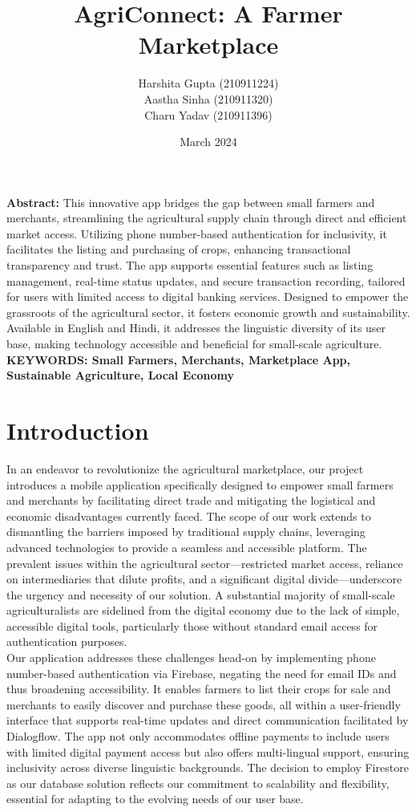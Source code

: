 \documentclass{article}
\title{\textbf{AgriConnect: A Farmer Marketplace}}
\author{Harshita Gupta (210911224)\\
        Aastha Sinha (210911320)\\
        Charu Yadav (210911396)}
\date{March 2024}
\begin{document}
\maketitle
\textbf{Abstract:}
This innovative app bridges the gap between small farmers and merchants, streamlining the agricultural supply chain through direct and efficient market access. Utilizing phone number-based authentication for inclusivity, it facilitates the listing and purchasing of crops, enhancing transactional transparency and trust. The app supports essential features such as listing management, real-time status updates, and secure transaction recording, tailored for users with limited access to digital banking services. Designed to empower the grassroots of the agricultural sector, it fosters economic growth and sustainability. Available in English and Hindi, it addresses the linguistic diversity of its user base, making technology accessible and beneficial for small-scale agriculture.\\

\textbf{KEYWORDS: Small Farmers, Merchants, Marketplace App, Sustainable Agriculture, Local Economy}

\section{Introduction}
\label{sec:introduction}

In an endeavor to revolutionize the agricultural marketplace, our project introduces a mobile application specifically designed to empower small farmers and merchants by facilitating direct trade and mitigating the logistical and economic disadvantages currently faced. The scope of our work extends to dismantling the barriers imposed by traditional supply chains, leveraging advanced technologies to provide a seamless and accessible platform. The prevalent issues within the agricultural sector—restricted market access, reliance on intermediaries that dilute profits, and a significant digital divide—underscore the urgency and necessity of our solution. A substantial majority of small-scale agriculturalists are sidelined from the digital economy due to the lack of simple, accessible digital tools, particularly those without standard email access for authentication purposes.\\

Our application addresses these challenges head-on by implementing phone number-based authentication via Firebase, negating the need for email IDs and thus broadening accessibility. It enables farmers to list their crops for sale and merchants to easily discover and purchase these goods, all within a user-friendly interface that supports real-time updates and direct communication facilitated by Dialogflow. The app not only accommodates offline payments to include users with limited digital payment access but also offers multi-lingual support, ensuring inclusivity across diverse linguistic backgrounds. The decision to employ Firestore as our database solution reflects our commitment to scalability and flexibility, essential for adapting to the evolving needs of our user base.\\
\end{document}
